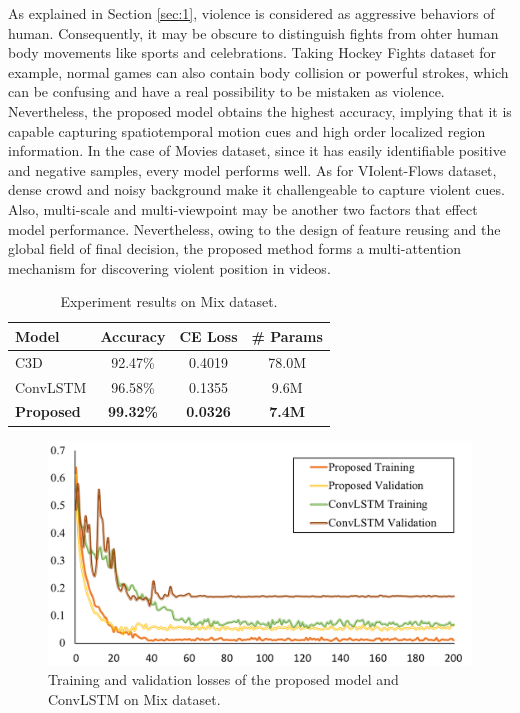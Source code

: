 \documentclass[10pt,twocolumn,letterpaper]{article}
\begin{document}
As explained in Section \ref{sec:1}, violence is considered as aggressive behaviors of human. 
Consequently, it may be obscure to distinguish fights from ohter human body movements like sports and celebrations.
Taking Hockey Fights dataset for example, normal games can also contain body collision or powerful strokes, which can be confusing and have a real possibility to be mistaken as violence.
Nevertheless, the proposed model obtains the highest accuracy, implying that it is capable capturing spatiotemporal motion cues and high order localized region information. 
In the case of Movies dataset, since it has easily identifiable positive and negative samples, every model performs well.
As for VIolent-Flows dataset, dense crowd and noisy background make it challengeable to capture violent cues. 
Also, multi-scale and multi-viewpoint may be  another two factors that effect model performance.
Nevertheless, owing to the design of feature reusing and the global field of final decision, the proposed method forms a multi-attention mechanism for discovering violent position in videos.


\begin{table}
\begin{center}
\caption{Experiment results on Mix dataset.}
\label{table:mix}
\begin{tabular}{lccc}
\hline
\textbf{Model} & \textbf{Accuracy} & \textbf{CE Loss} & \textbf{\# Params} \\
\hline\hline
C3D \cite{3dcnn_1} & 92.47\% & 0.4019 & 78.0M \\
ConvLSTM \cite{convlstm_sudh} & 96.58\% & 0.1355 & 9.6M \\
\textbf{Proposed} & \textbf{99.32\%} & \textbf{0.0326} & \textbf{7.4M} \\
\hline
\end{tabular}
\end{center}
\end{table}

\begin{figure}[t]
\begin{center}
\includegraphics[scale=0.46]{fig/fig3.png}
\end{center}
\caption{Training and validation losses of the proposed model and ConvLSTM \cite{convlstm_sudh} on Mix dataset.}
\label{fig:mix}
\end{figure}
\end{document}
